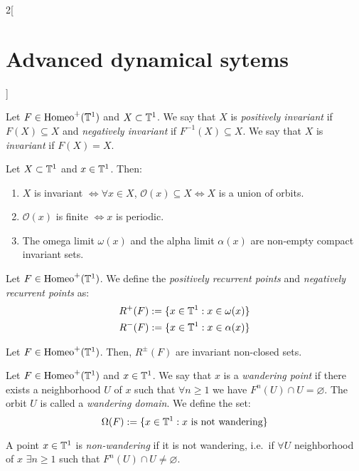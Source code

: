 \documentclass[../../../main_math.tex]{subfiles}
\begin{document}
\begin{multicols}{2}[\section{Advanced dynamical sytems}]
\begin{definition}
  \end{definition}
  \begin{definition}
    Let $F\in\mathrm{Homeo}^+(\mathbb{T}^1)$ and $X\subset \mathbb{T}^1$. We say that $X$ is \emph{positively invariant} if $F(X)\subseteq X$ and \emph{negatively invariant} if $F^{-1}(X)\subseteq X$. We say that $X$ is \emph{invariant} if $F(X)=X$.
  \end{definition}
  \begin{proposition}
    Let $X\subset \mathbb{T}^1$ and $x\in \mathbb{T}^1$. Then:
    \begin{enumerate}
      \item $X$ is invariant $\iff \forall x\in X$, $\mathcal{O}(x)\subseteq X\iff X$ is a union of orbits.
      \item $\mathcal{O}(x)$ is finite $\iff x$ is periodic.
      \item The omega limit $\omega(x)$ and the alpha limit $\alpha(x)$ are non-empty compact invariant sets.
    \end{enumerate}
  \end{proposition}
  \begin{definition}
    Let $F\in \mathrm{Homeo}^+(\mathbb{T}^1)$. We define the \emph{positively recurrent points} and \emph{negatively recurrent points} as:
    \begin{align*}
      R^+(F):=\{x\in\mathbb{T}^1:x\in\omega(x)\} \\
      R^-(F):=\{x\in\mathbb{T}^1:x\in\alpha(x)\}
    \end{align*}
  \end{definition}
  \begin{proposition}
    Let $F\in \mathrm{Homeo}^+(\mathbb{T}^1)$. Then, $R^\pm(F)$ are invariant non-closed sets.
  \end{proposition}
  \begin{definition}
    Let $F\in \mathrm{Homeo}^+(\mathbb{T}^1)$ and $x\in \mathbb{T}^1$. We say that $x$ is a \emph{wandering point} if there exists a neighborhood $U$ of $x$ such that $\forall n\geq 1$ we have $F^n(U)\cap U=\varnothing$. The orbit $U$ is called a \emph{wandering domain}. We define the set:
    $$
      \Omega(F):=\{ x\in\mathbb{T}^1: x\text{ is not wandering}\}
    $$
  \end{definition}
  \begin{remark}
    A point $x\in\mathbb{T}^1$ is \emph{non-wandering} if it is not wandering, i.e.\ if $\forall U$ neighborhood of $x$ $\exists n\geq 1$ such that $F^n(U)\cap U\ne\varnothing$.
  \end{remark}
  \begin{proposition}

\end{proposition}
\end{multicols}
\end{document}
